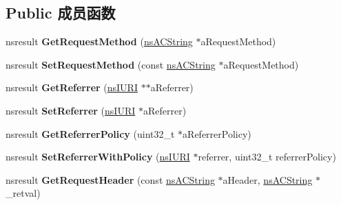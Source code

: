 \subsection*{Public 成员函数}
\begin{DoxyCompactItemize}
\item 
\mbox{\label{interfacens_i_http_channel_a64dac6c4ea7949308b532cf420b2bd96}} 
nsresult {\bfseries Get\+Request\+Method} (\hyperlink{structns_c_string_container}{ns\+A\+C\+String} $\ast$a\+Request\+Method)
\item 
\mbox{\label{interfacens_i_http_channel_ab5af0530c98107dd6725f3dd4256b47e}} 
nsresult {\bfseries Set\+Request\+Method} (const \hyperlink{structns_c_string_container}{ns\+A\+C\+String} $\ast$a\+Request\+Method)
\item 
\mbox{\label{interfacens_i_http_channel_a0436d664b4fe8e7975f50f90618042d0}} 
nsresult {\bfseries Get\+Referrer} (\hyperlink{interfacens_i_u_r_i}{ns\+I\+U\+RI} $\ast$$\ast$a\+Referrer)
\item 
\mbox{\label{interfacens_i_http_channel_a86810ed9c65600e1dc2d7bfcbee50ff7}} 
nsresult {\bfseries Set\+Referrer} (\hyperlink{interfacens_i_u_r_i}{ns\+I\+U\+RI} $\ast$a\+Referrer)
\item 
\mbox{\label{interfacens_i_http_channel_ac74109df0c449ca9e880b3c82c19ca10}} 
nsresult {\bfseries Get\+Referrer\+Policy} (uint32\+\_\+t $\ast$a\+Referrer\+Policy)
\item 
\mbox{\label{interfacens_i_http_channel_ad3a1b5afed32726b1f1298728f5e9c6d}} 
nsresult {\bfseries Set\+Referrer\+With\+Policy} (\hyperlink{interfacens_i_u_r_i}{ns\+I\+U\+RI} $\ast$referrer, uint32\+\_\+t referrer\+Policy)
\item 
\mbox{\label{interfacens_i_http_channel_aba6b1c7d402353ec923f442ef72d8b7f}} 
nsresult {\bfseries Get\+Request\+Header} (const \hyperlink{structns_c_string_container}{ns\+A\+C\+String} $\ast$a\+Header, \hyperlink{structns_c_string_container}{ns\+A\+C\+String} $\ast$\+\_\+retval)
\item 
\mbox{\label{interfacens_i_http_channel_aa0790e7ea560af32f15ed08a238679a1}} 
$$
\end{DoxyCompactItemize}
